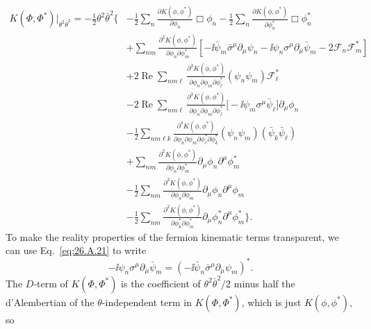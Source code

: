 \begin{equation}
  \begin{aligned}
  K(\Phi,\Phi^*)\big|_{\theta^2\bar\theta^2}
  =-\frac12\theta^2\bar\theta^2
  \biggl\{&
  -\frac12\sum_n
    \frac{\partial K(\phi,\phi^*)}{\partial\phi_n}\Box\phi_n
  -\frac12\sum_n
    \frac{\partial K(\phi,\phi^*)}{\partial\phi_n^*}\Box\phi_n^*
  \\
  &+\sum_{nm}
    \frac{\partial^2K(\phi,\phi^*)}
         {\partial\phi_n\partial\phi_m^*}
    \left[
      -\ii\bar\psi_m\bar\sigma^\mu\partial_\mu\psi_n
      -\ii\psi_n\sigma^\mu\partial_\mu\bar\psi_m
      -2\mathcal{F}_n\mathcal{F}_m^*
    \right]
  \\
  &+2\operatorname{Re}\sum_{nm\ell}
    \frac{\partial^3K(\phi,\phi^*)}
         {\partial\phi_n\partial\phi_m\partial\phi_\ell^*}
    (\psi_n\psi_m)\mathcal{F}_\ell^*
  \\
  &-2\operatorname{Re}\sum_{nm\ell}
    \frac{\partial^3K(\phi,\phi^*)}
         {\partial\phi_n\partial\phi_m\partial\phi_\ell^*}
    \bigl[-\ii\psi_m\sigma^\mu\bar\psi_\ell\bigr]
    \partial_\mu\phi_n
  \\
  &-\frac12\sum_{nm\ell k}
    \frac{\partial^4K(\phi,\phi^*)}
         {\partial\phi_n\partial\phi_m
          \partial\phi_\ell^*\partial\phi_k^*}
    (\psi_n\psi_m)(\bar\psi_k\bar\psi_\ell)
  \\
  &+\sum_{nm}
    \frac{\partial^2K(\phi,\phi^*)}
         {\partial\phi_n\partial\phi_m^*}
    \partial_\mu\phi_n\partial^\mu\phi_m^*
  \\
  &-\frac12\sum_{nm}
    \frac{\partial^2K(\phi,\phi^*)}
         {\partial\phi_n\partial\phi_m}
    \partial_\mu\phi_n\partial^\mu\phi_m
  \\
  &-\frac12\sum_{nm}
    \frac{\partial^2K(\phi,\phi^*)}
         {\partial\phi_n^*\partial\phi_m^*}
    \partial_\mu\phi_n^*\partial^\mu\phi_m^*
  \biggr\}.
  \end{aligned}
  \tag{26.8.3}\label{eq:26.8.3}
\end{equation}
To make the reality properties of the fermion kinematic terms transparent, we
can use Eq.~\eqref{eq:26.A.21} to write
\[
  -\ii\psi_n\sigma^\mu\partial_\mu\bar\psi_m
  =\left(-\ii\bar\psi_n\bar\sigma^\mu
    \partial_\mu\psi_m\right)^* .
\]
The \(D\)-term of \(K(\Phi,\Phi^*)\) is the coefficient of
\(\theta^2\bar\theta^2/2\) minus half the d'Alembertian of the
\(\theta\)-independent term in \(K(\Phi,\Phi^*)\), which is just
\(K(\phi,\phi^*)\), so
